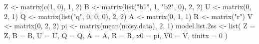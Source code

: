 \begin{Schunk}
\begin{Sinput}
 Z <- matrix(c(1, 0), 1, 2)
 B <- matrix(list("b1", 1, "b2", 0), 2, 2)
 U <- matrix(0, 2, 1)
 Q <- matrix(list("q", 0, 0, 0), 2, 2)
 A <- matrix(0, 1, 1)
 R <- matrix("r")
 V <- matrix(0, 2, 2)
 pi <- matrix(mean(noisy.data), 2, 1)
 model.list.2ss <- list(
   Z = Z, B = B, U = U, Q = Q, A = A,
   R = R, x0 = pi, V0 = V, tinitx = 0
 )
\end{Sinput}
\end{Schunk}
